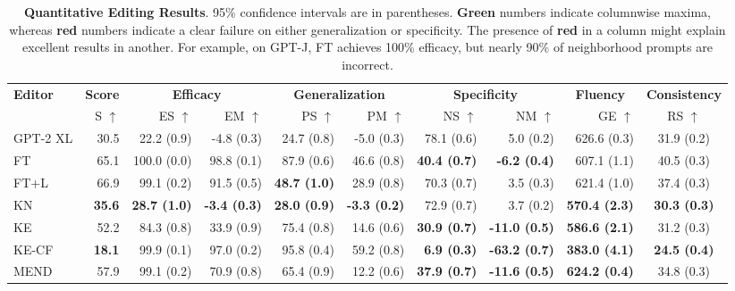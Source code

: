 \documentclass{article}
\newcommand{\badmetric}[1]{{\color{rred} \textbf{#1}}}
\newcommand{\goodmetric}[1]{{\color{ggreen} \textbf{#1}}}
\begin{document}
\begin{table}[!t]
    \centering
    \tiny
    \caption{\small \textbf{Quantitative Editing Results}. 95\% confidence intervals are in parentheses. \goodmetric{Green} numbers indicate columnwise maxima, whereas \badmetric{red} numbers indicate a clear failure on either generalization or specificity. The presence of \badmetric{red} in a column might explain excellent results in another. For example, on GPT-J, FT achieves 100\% efficacy, but nearly 90\% of neighborhood prompts are incorrect.}
    \label{tab:cf-results}
    \begin{adjustbox}{width=1\textwidth}
    \begin{tabular}{lrrrrrrrrc}
    \toprule
        \multirow{2.5}{*}{\textbf{Editor}} & \multicolumn{1}{c}{\textbf{Score}} & \multicolumn{2}{c}{\textbf{Efficacy}} & \multicolumn{2}{c}{\textbf{Generalization}} & \multicolumn{2}{c}{\textbf{Specificity}} & \multicolumn{1}{c}{\textbf{Fluency}} & \multicolumn{1}{c}{\textbf{Consistency}} \\
        \cmidrule(lr){2-2}\cmidrule(lr){3-4}\cmidrule(lr){5-6}\cmidrule(lr){7-8}\cmidrule(lr){9-9}\cmidrule(lr){10-10}
        & S $\uparrow$ & ES $\uparrow$ & EM $\uparrow$ & PS $\uparrow$ & PM $\uparrow$ & NS $\uparrow$ & NM $\uparrow$ & GE $\uparrow$ & RS $\uparrow$ \\
        \midrule
GPT-2 XL & 30.5 & 22.2 (0.9) & -4.8 (0.3) & 24.7 (0.8) & -5.0 (0.3) & 78.1 (0.6) & 5.0 (0.2) & 626.6 (0.3) & 31.9 (0.2)\\\midrule
FT & 65.1 & 100.0 (0.0) & 98.8 (0.1) & 87.9 (0.6) & 46.6 (0.8) & \badmetric{40.4 (0.7)} & \badmetric{-6.2 (0.4)} & 607.1 (1.1) & 40.5 (0.3)\\
FT+L & 66.9 & 99.1 (0.2) & 91.5 (0.5) & \badmetric{48.7 (1.0)} & 28.9 (0.8) & 70.3 (0.7) & 3.5 (0.3) & 621.4 (1.0) & 37.4 (0.3)\\
KN & \badmetric{35.6} & \badmetric{28.7 (1.0)} & \badmetric{-3.4 (0.3)} & \badmetric{28.0 (0.9)} & \badmetric{-3.3 (0.2)} & 72.9 (0.7) & 3.7 (0.2) & \badmetric{570.4 (2.3)} & \badmetric{30.3 (0.3)}\\
KE & 52.2 & 84.3 (0.8) & 33.9 (0.9) & 75.4 (0.8) & 14.6 (0.6) & \badmetric{30.9 (0.7)} & \badmetric{-11.0 (0.5)} & \badmetric{586.6 (2.1)} & 31.2 (0.3)\\
KE-CF & \badmetric{18.1} & 99.9 (0.1) & 97.0 (0.2) & 95.8 (0.4) & 59.2 (0.8) & \badmetric{6.9 (0.3)} & \badmetric{-63.2 (0.7)} & \badmetric{383.0 (4.1)} & \badmetric{24.5 (0.4)}\\
MEND & 57.9 & 99.1 (0.2) & 70.9 (0.8) & 65.4 (0.9) & 12.2 (0.6) & \badmetric{37.9 (0.7)} & \badmetric{-11.6 (0.5)} & \goodmetric{624.2 (0.4)} & 34.8 (0.3)\\

\end{tabular}
\end{adjustbox}
\end{table}
\end{document}
